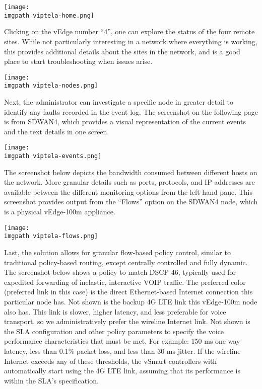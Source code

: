     \begin{minipage}[t]{\linewidth}
	  \centering
      \texttt{[image: \\imgpath viptela-home.png]}
    \end{minipage}

Clicking on the vEdge number ``4'', one can explore the status of the four
remote sites. While not particularly interesting in a network where everything
is working, this provides additional details about the sites in the network,
and is a good place to start troubleshooting when issues arise.

    \begin{minipage}[t]{\linewidth}
	  \centering
      \texttt{[image: \\imgpath viptela-nodes.png]}
    \end{minipage}

Next, the administrator can investigate a specific node in greater detail to
identify any faults recorded in the event log. The screenshot on the following
page is from SDWAN4, which provides a visual representation of the current
events and the text details in one screen.

    \begin{minipage}[t]{\linewidth}
	  \centering
      \texttt{[image: \\imgpath viptela-events.png]}
    \end{minipage}

The screenshot below depicts the bandwidth consumed between different hosts on
the network. More granular details such as ports, protocols, and IP addresses
are available between the different monitoring options from the left-hand
pane. This screenshot provides output from the ``Flows'' option on the SDWAN4
node, which is a physical vEdge-100m appliance.

    \begin{minipage}[t]{\linewidth}
	  \centering
      \texttt{[image: \\imgpath viptela-flows.png]}
    \end{minipage}

Last, the solution allows for granular flow-based policy control, similar to
traditional policy-based routing, except centrally controlled and fully
dynamic. The screenshot below shows a policy to match DSCP 46, typically used
for expedited forwarding of inelastic, interactive VOIP traffic. The preferred
color (preferred link in this case) is the direct Ethernet-based Internet
connection this particular node has. Not shown is the backup 4G LTE link this
vEdge-100m node also has. This link is slower, higher latency, and less
preferable for voice transport, so we administratively prefer the wireline
Internet link. Not shown is the SLA configuration and other policy parameters
to specify the voice performance characteristics that must be met. For
example: 150 ms one way latency, less than 0.1\% packet loss, and less than 30
ms jitter. If the wireline Internet exceeds any of these thresholds, the
vSmart controllers with automatically start using the 4G LTE link, assuming
that its performance is within the SLA's specification.

